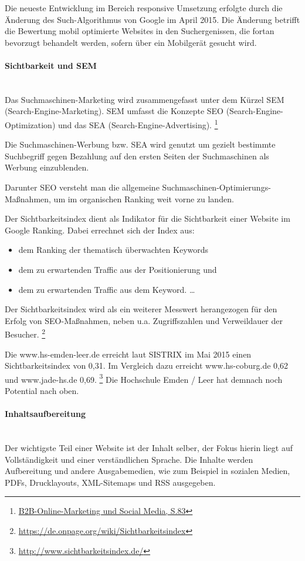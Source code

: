 Die neueste Entwicklung im Bereich responsive Umsetzung erfolgte durch die Änderung des Such-Algorithmus von Google im April 2015. Die Änderung betrifft die Bewertung mobil optimierte Websites in den Suchergenissen, die fortan bevorzugt behandelt werden, sofern über ein Mobilgerät gesucht wird.

\paragraph{Sichtbarkeit und SEM}\mbox{}\\ %
Das Suchmaschinen-Marketing wird zusammengefasst unter dem Kürzel SEM (Search-Engine-Marketing). SEM umfasst die Konzepte SEO (Search-Engine-Optimization) und das SEA (Search-Engine-Advertising). \footnote{\url{B2B-Online-Marketing und Social Media, S.83}}

Die Suchmaschinen-Werbung bzw. SEA wird genutzt um gezielt bestimmte Suchbegriff gegen Bezahlung auf den ersten Seiten der Suchmaschinen als Werbung einzublenden.

Darunter SEO versteht man die allgemeine Suchmaschinen-Optimierungs-Maßnahmen, um im organischen Ranking weit vorne zu landen.

Der Sichtbarkeitsindex dient als Indikator für die Sichtbarkeit einer Website im Google Ranking. Dabei errechnet sich der Index aus:


\begin{itemize}
  \item dem Ranking der thematisch überwachten Keywords
  \item dem zu erwartenden Traffic aus der Positionierung und
  \item dem zu erwartenden Traffic aus dem Keyword. \ldots
\end{itemize}

Der Sichtbarkeitsindex wird als ein weiterer Messwert herangezogen für den Erfolg von SEO-Maßnahmen, neben u.a. Zugriffszahlen und Verweildauer der Besucher. \footnote{\url{https://de.onpage.org/wiki/Sichtbarkeitsindex}}

Die www.hs-emden-leer.de erreicht laut SISTRIX im Mai 2015 einen Sichtbarkeitsindex von 0,31. Im Vergleich dazu erreicht www.hs-coburg.de 0,62 und www.jade-hs.de 0,69. \footnote{\url{http://www.sichtbarkeitsindex.de/}} Die Hochschule Emden / Leer hat demnach noch Potential nach oben.

\paragraph{Inhaltsaufbereitung}\mbox{}\\ %
Der wichtigste Teil einer Website ist der Inhalt selber, der Fokus hierin liegt auf Vollständigkeit und einer verständlichen Sprache. Die Inhalte werden Aufbereitung und andere Ausgabemedien, wie zum Beispiel in sozialen Medien, PDFs, Drucklayouts, XML-Sitemaps und RSS ausgegeben.

